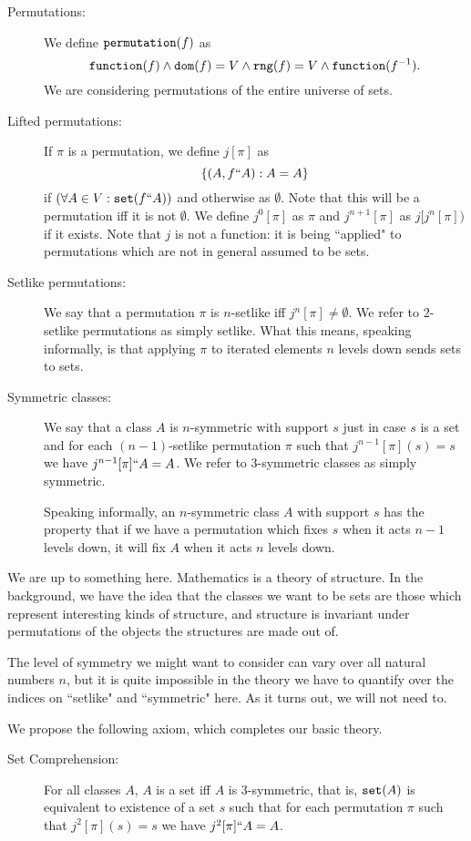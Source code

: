 \documentclass[12pt]{article}
\begin{document}
\begin{description}
\item[Permutations:]  We define ${\tt permutation}(f)$ as $${\tt function}(f) \wedge {\tt dom}(f)=V \wedge {\tt rng}(f)=V \wedge {\tt function}(f^{-1}).$$  We are considering permutations of the entire universe of sets.

\item[Lifted permutations:]  If $\pi$ is a permutation, we define $j[\pi]$ as $$\{(A,f``A):A=A\}$$ if $(\forall A\in V:{\tt set}(f``A))$ and otherwise as $\emptyset$.
Note that this will be a permutation iff it is not $\emptyset$.
We define $j^0[\pi]$ as $\pi$ and $j^{n+1}[\pi]$ as $j[j^n[\pi])$ if it exists.  Note that $j$ is not a function:  it is being ``applied" to permutations which are not in general assumed to be sets.

\item[Setlike permutations:]  We say that a permutation $\pi$ is $n$-setlike iff $j^n[\pi] \neq \emptyset$.  We refer to 2-setlike permutations as simply setlike.  What this means, speaking informally, is that applying $\pi$ to iterated elements $n$ levels down sends sets to sets.

\item[Symmetric classes:]  We say that a class $A$ is $n$-symmetric with support $s$ just in case $s$ is a set and for each $(n-1)$-setlike permutation $\pi$ such
that $j^{n-1}[\pi](s)=s$ we have $j^{n-1}[\pi]``A = A$.  We refer to 3-symmetric classes as simply symmetric.

Speaking informally, an $n$-symmetric class $A$ with support $s$ has the property that if we have a permutation which fixes $s$ when it acts $n-1$ levels down,
it will fix $A$ when it acts $n$ levels down.

\end{description}

We are up to something here.  Mathematics is a theory of structure.  In the background, we have the idea that the classes we want to be sets are those
which represent interesting kinds of structure, and structure is invariant under permutations of the objects the structures are made out of.

The level of symmetry we might want to consider can vary over all natural numbers $n$, but it is quite impossible in the theory we have to quantify over the indices
on ``setlike" and ``symmetric" here.  As it turns out, we will not need to.

We propose the following axiom, which completes our basic theory.

\begin{description}

\item[Set Comprehension:]  For all classes $A$, $A$ is a set iff $A$ is 3-symmetric, that is, ${\tt set}(A)$ is equivalent to existence of a set $s$ such 
that for each permutation $\pi$ such that $j^2[\pi](s)=s$ we have $j^2[\pi]``A=A$.

\end{description}
\end{document}
